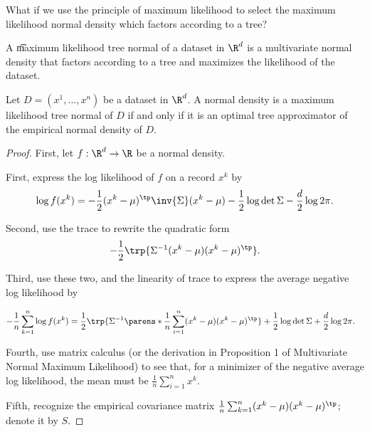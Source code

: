 

What if we use the principle of maximum likelihood to select the maximum likelihood normal density which factors according to a tree?


A \t{maximum likelihood tree normal} of a dataset in $\R^d$ is a multivariate normal density that factors according to a tree and maximizes the likelihood of the dataset.


\begin{prop}

Let $D = (x^1, \dots, x^n)$ be a dataset in $\R^d$.
A normal density is a maximum likelihood tree normal of $D$ if and only if it is an optimal tree approximator of the empirical normal density of $D$.

\begin{proof}

First, let $f: \R^d \to \R$ be a normal density.

First, express the log likelihood of $f$ on a record $x^k$ by
$$
  \log f(x^k) = - \frac{1}{2} (x^k - \mu)^{\tp} \inv{\Sigma} (x^k - \mu) - \frac{1}{2} \log \det \Sigma - \frac{d}{2}\log 2\pi.
$$

Second, use the trace to rewrite the quadratic form
$$
  -\frac{1}{2}\trp{\Sigma^{-1} (x^k - \mu) (x^k - \mu)^{\tp}}.
$$

Third, use these two, and the linearity of trace to express the average negative log likelihood by

$$
  \begin{aligned}
    - \frac{1}{n} \sum_{k = 1}^{n} \log f(x^k) &= \frac{1}{2} \trp{\Sigma^{-1}\parens*{\frac{1}{n}\sum_{i = 1}^{n} (x^k - \mu)(x^k - \mu)^{\tp}}} + \frac{1}{2}\log\det\Sigma + \frac{d}{2}\log 2\pi.
  \end{aligned}
$$

  Fourth, use matrix calculus (or the derivation in Proposition 1 of Multivariate Normal Maximum Likelihood) to see that, for a minimizer of the negative average log likelihood, the mean must be $\frac{1}{n} \sum_{i = 1}^{n} x^k$.

  Fifth, recognize the empirical covariance matrix $\frac{1}{n}\sum_{k = 1}^{n} (x^k - \mu)(x^k - \mu)^{\tp}$; denote it by $S$.


\end{proof}
\end{prop}
